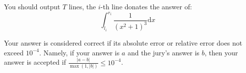 You should output $T$ lines, the $i$-th line donates the answer of:
$$
\int_{l_i}^{r_i}\frac{1}{(x^2+1)^3}\mathrm{d}x
$$

Your answer is considered correct if its absolute error or relative error does not exceed $10^{-4}$. Namely, if your answer is $a$ and the jury's answer is $b$, then your answer is accepted if $\frac{|a-b|}{\max(1, |b|)}\le 10^{-4}$.